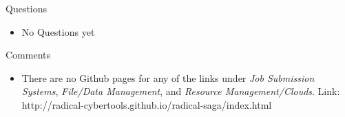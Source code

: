 \documentclass[letterpaper,english,12pt]{article}
\begin{document}
Questions
\begin{itemize}
	\item No Questions yet
\end{itemize}

Comments
\begin{itemize}
	\item There are no Github pages for any of the links under {\em Job Submission Systems}, {\em File/Data Management}, and {\em Resource Management/Clouds}. Link: http://radical-cybertools.github.io/radical-saga/index.html
\end{itemize}
\end{document}
